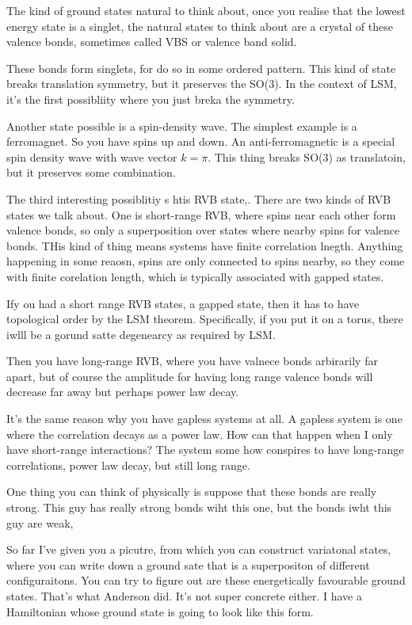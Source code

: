 The kind of ground states natural to think about,
once you realise that the lowest energy state is a singlet,
the natural states to think about are a crystal of these valence bonds,
sometimes called VBS or valence band solid.

These bonds form singlets,
for do so in some ordered pattern.
This kind of state breaks translation symmetry,
but it preserves the SO(3).
In the context of LSM,
it's the first possibliity where you just breka the symmetry.

Another state possible is a spin-density wave.
The simplest example is a ferromagnet.
So you have spins up and down.
An anti-ferromagnetic is a special spin density wave with wave vector $k=\pi$.
This thing breaks SO(3) as translatoin,
but it preserves some combination.

The third interesting possiblitiy s htis RVB state,.
There are two kinds of RVB states we talk about.
One is short-range RVB,
where spins near each other form valence bonds,
so only a superposition over states where nearby spins for valence bonds.
THis kind of thing means systems have finite correlation lnegth.
Anything happening in some reaosn,
spins are only connected to spins nearby,
so they come with finite corelation length,
which is typically associated with gapped states.

Ify ou had a short range RVB states,
a gapped state,
then it has to have topological order by the LSM theorem.
Specifically,
if you put it on a torus,
there iwlll be a gorund satte degenearcy as required by LSM.

Then you have long-range RVB,
where you have valnece bonds arbirarily far apart,
but of course the amplitude for having long range valence bonds will decrease
far away but perhaps power law decay.


It's the same reason why you have gapless systems at all.
A gapless system is one where the correlation decays as a power law.
How can that happen when I only have short-range interactions?
The system some how conspires to have long-range correlations,
power law decay,
but still long range.

One thing you can think of physically is suppose that these bonds are really
strong.
This guy has really strong bonds wiht this one,
but the bonds iwht this guy are weak,

So far I've given you a picutre,
from which you can construct variatonal states,
where you can write down a ground sate that is a superpositon of different
configuraitons.
You can try to figure out are these energetically favourable ground states.
That's what Anderson did.
It's not super concrete either.
I have a Hamiltonian whose ground state is going to look like this form.

